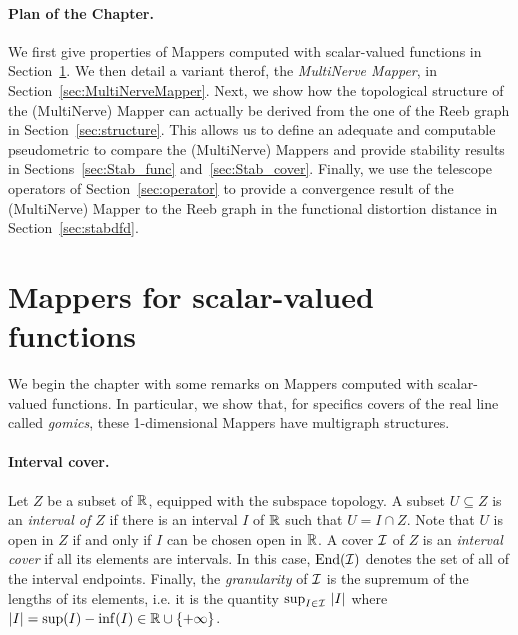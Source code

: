 \paragraph*{Plan of the Chapter.} We first give properties of Mappers computed with scalar-valued functions in Section~\ref{sec:1Dmapper}. 
We then detail a variant therof, the {\em MultiNerve Mapper},
in Section~\ref{sec:MultiNerveMapper}. Next, we show how the topological structure of the (MultiNerve) Mapper can actually be derived
from the one of the Reeb graph in Section~\ref{sec:structure}. This allows us to define an adequate and computable pseudometric to compare the
(MultiNerve) Mappers and provide stability results in Sections~\ref{sec:Stab_func} and~\ref{sec:Stab_cover}. Finally, we use the telescope operators of
Section~\ref{sec:operator} to provide a convergence result of the (MultiNerve) Mapper to the Reeb graph in the 
functional distortion distance in Section~\ref{sec:stabdfd}. 



\section{Mappers for scalar-valued functions}
\label{sec:1Dmapper}

We begin the chapter with some remarks on Mappers computed with scalar-valued functions.
In particular, we show that, for specifics covers of the real line called {\em gomics}, these 1-dimensional Mappers
have multigraph structures. 

\paragraph*{Interval cover.} Let $Z$ be a subset of $\mathbb{R}$, equipped
with the subspace topology. A subset $U\subseteq Z$ is an {\em interval of $Z$} 
if there is an interval $I$ of $\mathbb{R}$ such that
$U=I\cap Z$. Note that $U$ is open in $Z$ if and only if $I$ can be
chosen open in $\mathbb{R}$.  A cover $\mathcal{I}$ of $Z$ is an {\em interval cover}
if all its elements are intervals. In this case, $\mathrm{End}(\mathcal{I})$
denotes the set of all of the interval endpoints. Finally, the
{\em granularity} of $\mathcal{I}$ is the
supremum of the lengths of its elements, i.e. it is the quantity $\text{sup}_{I\in\mathcal{I}}\ |I|$ where
$|I|=\sup(I)-\inf(I)\in\mathbb{R}\cup\{+\infty\}$.

